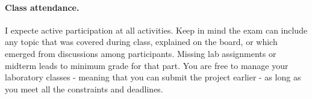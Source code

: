 \paragraph{Class attendance.} 
I expecte active participation at all activities. %
Keep in mind the exam can include any topic that was covered during class, explained on the board, 
or which emerged from discussions among participants. 
Missing lab assignments or midterm leads to minimum grade for that part.
You are free to manage your laboratory classes - meaning that you can submit the project earlier -  as long as you meet all the constraints and deadlines.
